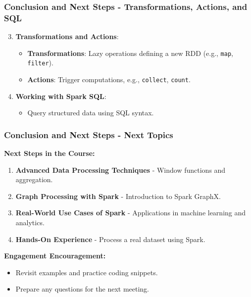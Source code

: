 \documentclass[aspectratio=169]{beamer}
\begin{document}
\begin{frame}[fragile]
  \frametitle{Conclusion and Next Steps - Transformations, Actions, and SQL}
  
  \begin{enumerate}
      \setcounter{enumi}{2}
      \item \textbf{Transformations and Actions}:
      \begin{itemize}
          \item \textbf{Transformations}: Lazy operations defining a new RDD (e.g., \texttt{map}, \texttt{filter}).
          \item \textbf{Actions}: Trigger computations, e.g., \texttt{collect}, \texttt{count}.
      \end{itemize}
      
      \item \textbf{Working with Spark SQL}:
      \begin{itemize}
          \item Query structured data using SQL syntax.
      \end{itemize}
  \end{enumerate}
\end{frame}

\begin{frame}[fragile]
  \frametitle{Conclusion and Next Steps - Next Topics}
  
  \textbf{Next Steps in the Course:}
  
  \begin{enumerate}
      \item \textbf{Advanced Data Processing Techniques} - Window functions and aggregation.
      \item \textbf{Graph Processing with Spark} - Introduction to Spark GraphX.
      \item \textbf{Real-World Use Cases of Spark} - Applications in machine learning and analytics.
      \item \textbf{Hands-On Experience} - Process a real dataset using Spark.
  \end{enumerate}
  
  \textbf{Engagement Encouragement:}
  
  \begin{itemize}
      \item Revisit examples and practice coding snippets.
      \item Prepare any questions for the next meeting.
  \end{itemize}
\end{frame}
\end{document}
